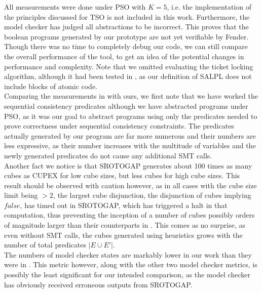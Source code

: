 All measurements were done under PSO with $K = 5$, i.e. the implementation of the principles discussed for TSO is not included in this work. Furthermore, the model checker has judged all abstractions to be incorrect. This proves that the boolean programs generated by our prototype are not yet verifiable by Fender. Though there was no time to completely debug our code, we can still compare the overall performance of the tool, to get an idea of the potential changes in performance and complexity. Note that we omitted evaluating the ticket locking algorithm, although it had been tested in \cite{danetal13}, as our definition of SALPL does not include blocks of atomic code.\\

Comparing the measurements in \cite{danetal13} with ours, we first note that we have worked the sequential consistency predicates although we have abstracted programs under PSO, as it was our goal to abstract programs using only the predicates needed to prove correctness under sequential consistency constraints. The predicates actually generated by our program are far more numerous and their numbers are less expressive, as their number increases with the multitude of variables and the newly generated predicates do not cause any additional SMT calls.\\

Another fact we notice is that SROTOGAP generates about 100 times as many cubes as CUPEX \cite{danetal13} for low cube sizes, but less cubes for high cube sizes. This result should be observed with caution however, as in all cases with the cube size limit being $> 2$, the largest cube disjunction, the disjunction of cubes implying $false$, has timed out in SROTOGAP, which has triggered a halt in that computation, thus preventing the inception of a number of cubes possibly orders of magnitude larger than their counterparts in . This comes as no surprise, as even without SMT calls, the cubes generated using heuristics grows with the number of total predicates $|E \cup E'|$.\\

The numbers of model checker states are markably lower in our work than they were in \cite{danetal13}. This metric however, along with the other two model checker metrics, is possibly the least significant for our intended comparison, as the model checker has obviously received erroneous outputs from SROTOGAP.